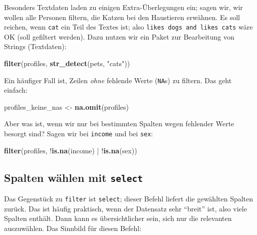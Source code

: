 \documentclass[12pt,]{book}
\makeatletter
\newenvironment{Shaded}{\begin{snugshade}}{\end{snugshade}}
\newcommand{\KeywordTok}[1]{\textcolor[rgb]{0.13,0.29,0.53}{\textbf{{#1}}}}
\newcommand{\StringTok}[1]{\textcolor[rgb]{0.31,0.60,0.02}{{#1}}}
\newcommand{\NormalTok}[1]{{#1}}
\newenvironment{kframe}{%
\medskip{}
\setlength{\fboxsep}{.8em}
 \def\at@end@of@kframe{}%
 \ifinner\ifhmode%
  \def\at@end@of@kframe{\end{minipage}}%
  \begin{minipage}{\columnwidth}%
 \fi\fi%
 \def\FrameCommand##1{\hskip\@totalleftmargin \hskip-\fboxsep
 \colorbox{shadecolor}{##1}\hskip-\fboxsep
     \hskip-\linewidth \hskip-\@totalleftmargin \hskip\columnwidth}%
 \MakeFramed {\advance\hsize-\width
   \@totalleftmargin\z@ \linewidth\hsize
   \@setminipage}}%
 {\par\unskip\endMakeFramed%
 \at@end@of@kframe}
\renewenvironment{Shaded}{\begin{kframe}}{\end{kframe}}
\makeatother
\begin{document}
Besonders Textdaten laden zu einigen Extra-Überlegungen ein; sagen wir,
wir wollen alle Personen filtern, die Katzen bei den Haustieren
erwähnen. Es soll reichen, wenn \texttt{cat} ein Teil des Textes ist;
also \texttt{likes\ dogs\ and\ likes\ cats} wäre OK (soll gefiltert
werden). Dazu nutzen wir ein Paket zur Bearbeitung von Strings
(Textdaten):

\begin{Shaded}
\begin{Highlighting}[]

\KeywordTok{filter}\NormalTok{(profiles, }\KeywordTok{str_detect}\NormalTok{(pets, }\StringTok{"cats"}\NormalTok{))}
\end{Highlighting}
\end{Shaded}

Ein häufiger Fall ist, Zeilen \emph{ohne} fehlende Werte (\texttt{NA}s)
zu filtern. Das geht einfach:

\begin{Shaded}
\begin{Highlighting}[]
\NormalTok{profiles_keine_nas <-}\StringTok{ }\KeywordTok{na.omit}\NormalTok{(profiles)}
\end{Highlighting}
\end{Shaded}

Aber was ist, wenn wir nur bei bestimmten Spalten wegen fehlender Werte
besorgt sind? Sagen wir bei \texttt{income} und bei \texttt{sex}:

\begin{Shaded}
\begin{Highlighting}[]
\KeywordTok{filter}\NormalTok{(profiles, !}\KeywordTok{is.na}\NormalTok{(income) |}\StringTok{ }\NormalTok{!}\KeywordTok{is.na}\NormalTok{(sex))}
\end{Highlighting}
\end{Shaded}

\subsection{\texorpdfstring{Spalten wählen mit
\texttt{select}}{Spalten wählen mit select}}\label{spalten-wahlen-mit-select}

Das Gegenstück zu \texttt{filter} ist \texttt{select}; dieser Befehl
liefert die gewählten Spalten zurück. Das ist häufig praktisch, wenn der
Datensatz sehr ``breit'' ist, also viele Spalten enthält. Dann kann es
übersichtlicher sein, sich nur die relevanten auszuwählen. Das Sinnbild
für diesen Befehl:
\end{document}
